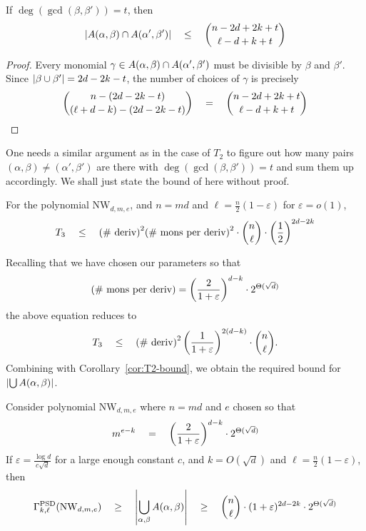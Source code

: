 \documentclass{beatcs}
\newcommand{\NW}{\mathrm{NW}}
\newcommand{\spaced}[1]{\quad#1\quad}
\renewcommand{\epsilon}{\varepsilon}
\begin{document}
\begin{observation}\label{obs:T3-proxy}
If $\deg(\gcd(\beta, \beta')) = t$, then
\[
\abs{A(\alpha, \beta) \intersection A(\alpha', \beta')} \spaced{\leq} \binom{n - 2d + 2k + t}{\ell - d + k +t}
\]
\end{observation}
\begin{proof}
Every monomial $\gamma \in A(\alpha, \beta) \cap A(\alpha', \beta')$ must be divisible by $\beta$ and $\beta'$. Since $\left|\beta \cup \beta'\right| = 2d - 2k - t$, the number of choices of $\gamma$ is precisely
\[
\binom{n - (2d - 2k -t)}{(\ell + d - k) - (2d - 2k - t)} \quad = \quad \binom{n - 2d + 2k + t}{\ell - d + k + t}\qedhere
\]
\end{proof}

One needs a similar argument as in the case of $T_2$ to figure out how many pairs $(\alpha, \beta) \neq (\alpha',\beta')$ are there with $\deg(\gcd(\beta, \beta')) = t$ and sum them up accordingly. We shall just state the bound of \cite{KS14} here without proof. 

\begin{lemma}[\cite{KS14}] \label{lem:T3-bound}
For the polynomial $\NW_{d,m,e}$, and $n = md$ and $\ell = \frac{n}{2}(1 - \epsilon)$ for $\epsilon = o(1)$, 
\[
T_3 \quad \leq \quad \text{(\# deriv)}^2 \text{(\# mons per deriv)}^2 \cdot \binom{n}{\ell}\cdot \left(\frac{1}{2}\right)^{2d - 2k}
\]
\end{lemma}

Recalling that we have chosen our parameters so that 
\[
\text{(\# mons per deriv)} = \inparen{\frac{2}{1+\epsilon}}^{d-k} \cdot 2^{\Theta(\sqrt{d})}
\]
the above equation reduces to 
\[
T_3 \quad \leq \quad \text{(\# deriv)}^2 \inparen{\frac{1}{1+\epsilon}}^{2(d-k)} \cdot \binom{n}{\ell}.
\]
Combining with Corollary~\ref{cor:T2-bound}, we obtain the required bound for $\left|\bigcup A(\alpha, \beta)\right|$. 

\begin{lemma}
Consider polynomial $\NW_{d,m,e}$ where $n = md$ and $e$ chosen so that
\[m^{e-k} \spaced{=}  \inparen{\frac{2}{1+\epsilon}}^{d-k} \cdot 2^{\Theta(\sqrt{d})}\]
If $\epsilon = \frac{\log d}{c\sqrt{d}}$ for a large enough constant $c$, and $k = O(\sqrt{d})$ and $\ell = \frac{n}{2}(1 - \epsilon)$, then
\[
\Gamma^{\mathrm{PSD}}_{k,\ell}(\NW_{d,m,e})\spaced{\geq}\abs{\Union_{\alpha, \beta} A(\alpha, \beta)} \spaced{\geq} \binom{n}{\ell} \cdot (1+\epsilon)^{2d-2k} \cdot 2^{\Theta(\sqrt{d})}
\] 
\end{lemma}
\end{document}
